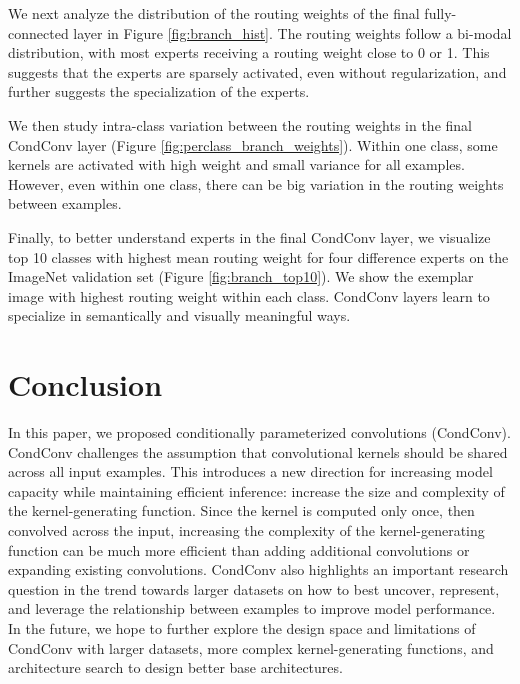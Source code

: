\documentclass{article}
\def\codename{CondConv}
\begin{document}
We next analyze the distribution of the routing weights of the final fully-connected layer in Figure \ref{fig:branch_hist}. The routing weights follow a bi-modal distribution, with most experts receiving a routing weight close to 0 or 1. This suggests that the experts are sparsely activated, even without regularization, and further suggests the specialization of the experts.


We then study intra-class variation between the routing weights in the final \codename{} layer (Figure \ref{fig:perclass_branch_weights}). Within one class, some kernels are activated with high weight and small variance for all examples. However, even within one class, there can be big variation in the routing weights between examples.


Finally, to better understand experts in the final \codename{} layer, we visualize top 10 classes with highest mean routing weight for four difference experts on the ImageNet validation set (Figure \ref{fig:branch_top10}). We show the exemplar image with highest routing weight within each class. \codename{} layers learn to specialize in semantically and visually meaningful ways.

\section{Conclusion}


In this paper, we proposed conditionally parameterized convolutions (\codename{}). \codename{} challenges the assumption that convolutional kernels should be shared across all input examples. This introduces a new direction for increasing model capacity while maintaining efficient inference: increase the size and complexity of the kernel-generating function. Since the kernel is computed only once, then convolved across the input, increasing the complexity of the kernel-generating function can be much more efficient than adding additional convolutions or expanding existing convolutions. \codename{} also highlights an important research question in the trend towards larger datasets on how to best uncover, represent, and leverage the relationship between examples to improve model performance. In the future, we hope to further explore the design space and limitations of \codename{} with larger datasets, more complex kernel-generating functions, and architecture search to design better base architectures.




\newpage
\end{document}
